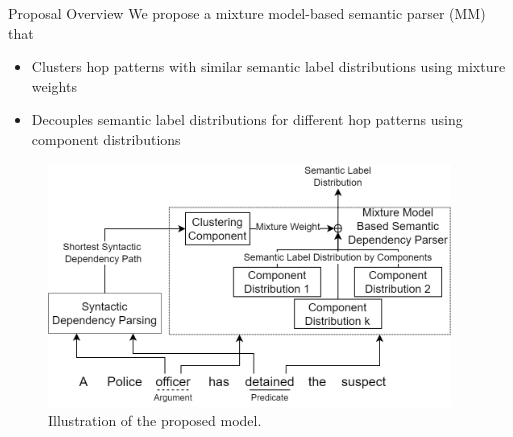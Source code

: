 \begin{exampleblock}{Proposal Overview}
We propose a mixture model-based semantic parser (MM) that
\begin{itemize}
    \vspace{-0.5cm}
    \item Clusters hop patterns with similar semantic label distributions using mixture weights
    \item Decouples semantic label distributions for different hop patterns using component distributions
\end{itemize}

\begin{figure}
    \centering
    \includegraphics[width=0.95\textwidth]{images/mm-illustra.drawio.png}
    \caption{Illustration of the proposed model.}
\end{figure}



\end{exampleblock}